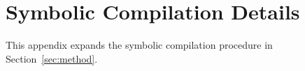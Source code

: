\section{Symbolic Compilation Details}
\label{app:compilation}
This appendix expands the symbolic compilation procedure in
Section~\ref{sec:method}.


\FloatBarrier

\FloatBarrier

\FloatBarrier

\FloatBarrier

